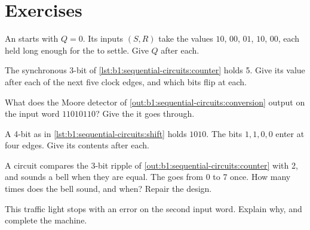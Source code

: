 \section{Exercises}\label{sec:b1:sequential-circuits:exercises}

\begin{exercise}[$\star$]\label{exo:b1:sequential-circuits:1}
An  starts with $Q = 0$. Its inputs $(S, R)$ take the values $10$, $00$, $01$, $10$, $00$, each held long enough
for the  to settle. Give $Q$ after each.
\end{exercise}

\begin{exercise}[$\star$]\label{exo:b1:sequential-circuits:2}
The synchronous 3-bit  of \cref{lst:b1:sequential-circuits:counter} holds 5. Give its value after each of the next
five clock edges, and which bits flip at each.
\end{exercise}

\begin{exercise}[$\star$]\label{exo:b1:sequential-circuits:3}
What does the Moore detector of \cref{out:b1:sequential-circuits:conversion} output on the input word $11010110$? Give the
 it goes through.
\end{exercise}

\begin{exercise}[$\star$]\label{exo:b1:sequential-circuits:4}
A 4-bit  as in \cref{lst:b1:sequential-circuits:shift} holds $1010$. The bits $1, 1, 0, 0$ enter at four
edges. Give its contents after each.
\end{exercise}

\begin{exercise}[$\star\star$]\label{exo:b1:sequential-circuits:5}
A circuit compares the 3-bit ripple  of \cref{out:b1:sequential-circuits:counter} with 2, and sounds a bell when
they are equal. The  goes from 0 to 7 once. How many times does the bell sound, and when? Repair the design.
\end{exercise}

\begin{exercise}[$\star\star$]\label{exo:b1:sequential-circuits:6}
This traffic light stops with an error on the second input word. Explain why, and complete the machine.
\end{exercise}

